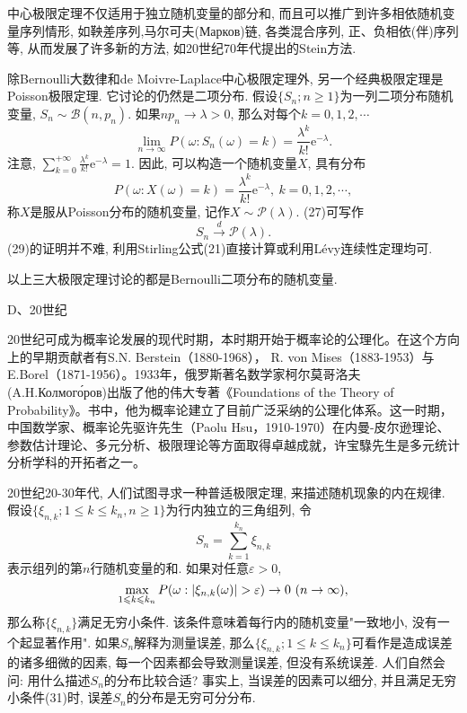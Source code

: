 \documentclass[a4paper,AutoFakeBold,oneside,12pt]{article}
\begin{document}
中心极限定理不仅适用于独立随机变量的部分和, 而且可以推广到许多相依随机变量序列情形, 如鞅差序列,马尔可夫(Марков)链, 各类混合序列, 正、负相依(伴)序列等, 从而发展了许多新的方法, 如20世纪70年代提出的Stein方法.

除Bernoulli大数律和de Moivre-Laplace中心极限定理外, 另一个经典极限定理是Poisson极限定理. 它讨论的仍然是二项分布. 假设$\{S_n;n\geqslant 1\}$为一列二项分布随机变量, $S_n\sim\mathcal{B}(n,p_n)$. 如果$np_n\to \lambda>0$, 那么对每个$k=0,1,2,\cdots$
\begin{equation}
    \lim_{n\to\infty}P(\omega:S_n(\omega) = k) = \frac{\lambda^k}{k!}\mathrm{e}^{-\lambda}.
\end{equation}
注意, $\sum_{k=0}^{+\infty}\frac{\lambda^k}{k!}\mathrm{e}^{-\lambda} = 1$. 因此, 可以构造一个随机变量$X$, 具有分布\begin{equation}
    P(\omega:X(\omega) = k) = \frac{\lambda^k}{k!}\mathrm{e}^{-\lambda},~k=0,1,2,\cdots,
\end{equation}
称$X$是服从Poisson分布的随机变量, 记作$X\sim\mathcal{P}(\lambda)$. (27)可写作
\begin{equation}
    S_n\stackrel{d}{\rightarrow}\mathcal{P}(\lambda).
\end{equation}
(29)的证明并不难, 利用Stirling公式(21)直接计算或利用Lévy连续性定理均可.

以上三大极限定理讨论的都是Bernoulli二项分布的随机变量.

D、20世纪

20世纪可成为概率论发展的现代时期，本时期开始于概率论的公理化。在这个方向上的早期贡献者有S.N. Berstein（1880-1968）， R. von Mises（1883-1953）与E.Borel（1871-1956）。1933年，俄罗斯著名数学家柯尔莫哥洛夫(A.H.Колмого́ров)出版了他的伟大专著《Foundations of the Theory of Probability》。书中，他为概率论建立了目前广泛采纳的公理化体系。这一时期，中国数学家、概率论先驱许先生（Paolu Hsu，1910-1970）在内曼-皮尔逊理论、参数估计理论、多元分析、极限理论等方面取得卓越成就，许宝騄先生是多元统计分析学科的开拓者之一。

20世纪20-30年代, 人们试图寻求一种普适极限定理, 来描述随机现象的内在规律. 假设$\{\xi_{n,k};1\leqslant k\leqslant k_n,n\geqslant 1 \}$为行内独立的三角组列, 令
\begin{equation}
    S_n = \sum_{k=1}^{k_n}\xi_{n,k}
\end{equation}
表示组列的第$n$行随机变量的和. 如果对任意$\varepsilon>0$,
\begin{equation}
    \max_{1\leqslant k\leqslant k_n}P(\omega:\abs{\xi_{n,k}(\omega)}>\varepsilon)\to 0~(n\to\infty),
\end{equation}
那么称$\{\xi_{n,k}\}$满足无穷小条件. 该条件意味着每行内的随机变量"一致地小, 没有一个起显著作用". 如果$S_n$解释为测量误差, 那么$\{\xi_{n,k};1\leqslant k\leqslant k_n\}$可看作是造成误差的诸多细微的因素, 每一个因素都会导致测量误差, 但没有系统误差. 人们自然会问: 用什么描述$S_n$的分布比较合适? 事实上, 当误差的因素可以细分, 并且满足无穷小条件(31)时, 误差$S_n$的分布是无穷可分分布.
\end{document}
